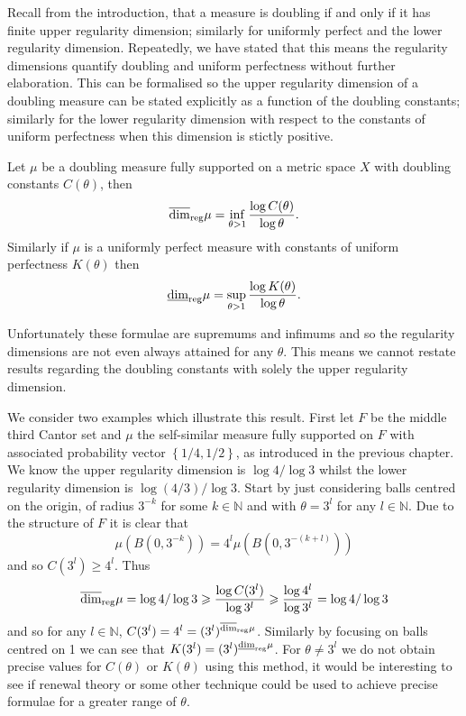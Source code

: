 Recall from the introduction, that a measure is doubling if and only if it has finite upper regularity dimension; similarly for uniformly perfect and the lower regularity dimension. Repeatedly, we have stated that this means the regularity dimensions quantify doubling and uniform perfectness without further elaboration. This can be formalised so the upper regularity dimension of a doubling measure can be stated explicitly as a function of the doubling constants; similarly for the lower regularity dimension with respect to the constants of uniform perfectness when this dimension is stictly positive. 

\begin{theorem}\label{ch-quantifying:equivalence}
Let $\mu$ be a doubling measure fully supported on a metric space $X$ with doubling constants $C(\theta)$, then $$\overline{\dim}_{\textup{reg}} \mu = \inf_{\theta > 1}\frac{\log C(\theta)}{\log \theta}.$$ Similarly if $\mu$ is a uniformly perfect measure with constants of uniform perfectness $K(\theta)$ then $$\underline{\dim}_{\textup{reg}} \mu = \sup_{\theta > 1} \frac{\log K(\theta)}{\log \theta}.$$
\end{theorem}


Unfortunately these formulae are supremums and infimums and so the regularity dimensions are not even always attained for any $\theta$. This means we cannot restate results regarding the doubling constants with solely the upper regularity dimension.

We consider two examples which illustrate this result. First let $F$ be the middle third Cantor set and $\mu$ the self-similar measure fully supported on $F$ with associated probability vector $\left\{ 1/4, 1/2 \right\}$, as introduced in the previous chapter. We know the upper regularity dimension is $\log 4 / \log 3$ whilst the lower regularity dimension is $\log(4/3) / \log 3$. Start by just considering balls centred on the origin, of radius $3^{-k}$ for some $k \in \mathbb{N}$ and with $\theta = 3^{l}$ for any $l \in \mathbb{N}$. Due to the structure of $F$ it is clear that 
\[
\mu(B(0, 3^{-k})) = 4^{l} \mu(B(0, 3^{-(k+l)}))
\]
and so $C(3^{l}) \ge 4^l$. Thus 
\[
\overline{\dim}_{\textup{reg}} \mu = \log 4 / \log 3 \geqslant \frac{\log C(3^{l})}{ \log 3^{l}} \geqslant \frac{ \log 4^l}{\log 3^l} =  \log 4 / \log 3
\]
and so for any $l \in \mathbb{N}$, $C(3^l) = 4^l = (3^l)^{\overline{\dim}_{\textup{reg}} \mu}$. Similarly by focusing on balls centred on 1 we can see that $K(3^l) = (3^l)^{\underline{\dim}_{\textup{reg}} \mu}$. For $\theta \neq 3^l$ we do not obtain precise values for $C(\theta)$ or $K(\theta)$ using this method, it would be interesting to see if renewal theory or some other technique could be used to achieve precise formulae for a greater range of $\theta$. 


